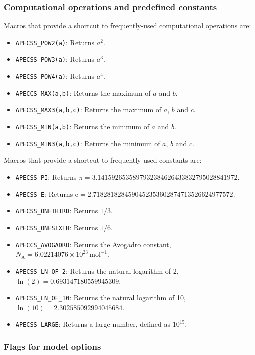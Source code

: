 \subsubsection{Computational operations and predefined constants}

Macros that provide a shortcut to frequently-used computational operations are:\vspace{-1em}
\begin{itemize}[noitemsep]
  \item {\tt APECSS\_POW2(a)}: Returns $a^2$.
  \item {\tt APECSS\_POW3(a)}: Returns $a^3$.
  \item {\tt APECSS\_POW4(a)}: Returns $a^4$.
  \item {\tt APECCS\_MAX(a,b)}: Returns the maximum of $a$ and $b$.
  \item {\tt APECSS\_MAX3(a,b,c)}: Returns the maximum of $a$, $b$ and $c$.
  \item {\tt APECSS\_MIN(a,b)}: Returns the minimum of $a$ and $b$.
  \item {\tt APECSS\_MIN3(a,b,c)}: Returns the minimum of $a$, $b$ and $c$.
\end{itemize}

Macros that provide a shortcut to frequently-used constants are:\vspace{-1em}
\begin{itemize}[noitemsep]
  \item {\tt APECSS\_PI}: Returns $\pi=3.1415926535897932384626433832795028841972$.
  \item {\tt APECSS\_E}: Returns $\mathrm{e}=2.7182818284590452353602874713526624977572$.
  \item {\tt APECSS\_ONETHIRD}: Returns $1/3$.
  \item {\tt APECSS\_ONESIXTH}: Returns $1/6$.
  \item {\tt APECCS\_AVOGADRO}: Returns the Avogadro constant, $N_\mathrm{A}=6.02214076 \times 10^{23} \, \mathrm{mol}^{-1}$.
  \item {\tt APECSS\_LN\_OF\_2}: Returns the natural logarithm of 2, $\ln(2)=0.693147180559945309$.
  \item {\tt APECSS\_LN\_OF\_10}: Returns the natural logarithm of 10, $\ln(10)=2.302585092994045684$.
  \item {\tt APECSS\_LARGE}: Returns a large number, defined as $10^{15}$.
\end{itemize}

\subsubsection{Flags for model options}


